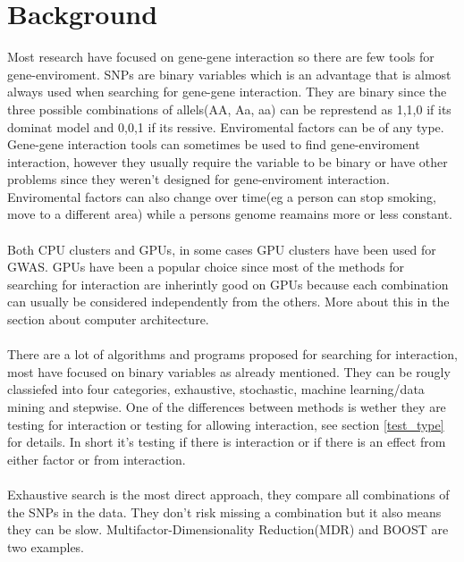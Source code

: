 \documentclass[10pt,a4paper]{article}
\begin{document}
\section{Background}
Most research have focused on gene-gene interaction so there are few tools for gene-enviroment. SNPs are binary variables which is an advantage that is almost always used when searching for gene-gene interaction. They are binary since the three possible combinations of allels(AA, Aa, aa)  can be represtend as 1,1,0 if its dominat model and 0,0,1 if its ressive\cite{}. Enviromental factors can be of any type\cite{gene_enviroment_2013}. Gene-gene interaction tools can sometimes be used to find gene-enviroment interaction, however they usually require the variable to be binary or have other problems since they weren't designed for gene-enviroment interaction. Enviromental factors can also change over time(eg a person can stop smoking, move to a different area) while a persons genome reamains more or less constant.\cite{gene_enviroment_2013}\\
\\
Both CPU clusters\cite{biforce} and GPUs\cite{gwis,gboost,gmdr_gpu,cuda_lr,genie_2012,plink_gpu}, in some cases GPU clusters\cite{} have been used for GWAS. GPUs have been a popular choice since most of the methods for searching for interaction are inherintly good on GPUs because each combination can usually be considered independently from the others. More about this in the section about computer architecture.\\
\\
There are a lot of algorithms and programs proposed for searching for interaction, most have focused on binary variables as already mentioned. They can be rougly classiefed into four categories, exhaustive, stochastic, machine learning/data mining and stepwise\cite{fast_high_order_cluster}. One of the differences between methods is wether they are testing for interaction or testing for allowing interaction, see section \ref{test_type} for details. In short it's testing if there is interaction or if there is an effect from either factor or from interaction.\\
\\
Exhaustive search is the most direct approach, they compare all combinations of the SNPs in the data. They don't risk missing a combination but it also means they can be slow. Multifactor-Dimensionality Reduction(MDR)\cite{mdr_2001} and BOOST\cite{boost_gene_gene} are two examples.\\
\end{document}
